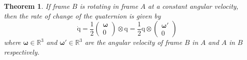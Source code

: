 \documentclass{amsart}
\newtheorem{theorem}{Theorem}[section]
\theoremstyle{definition}
\theoremstyle{remark}
\numberwithin{equation}{section}
\begin{document}
\begin{theorem}
  If frame $B$ is rotating in frame $A$ at a constant angular velocity, then the rate of change of the quaternion is given by
  \begin{equation}
    \mathrm{\dot{q}} = \frac{1}{2}
    \begin{pmatrix}
      \boldsymbol\omega\\
      0
    \end{pmatrix}
    \otimes \mathrm{q}
    = \frac{1}{2} \mathrm{q} \otimes
    \begin{pmatrix}
      \boldsymbol\omega'\\
      0
    \end{pmatrix}
  \end{equation}
  where $\boldsymbol\omega\in\mathbb{R}^3$ and $\boldsymbol\omega'\in\mathbb{R}^3$ are the angular velocity of frame $B$ in $A$ and $A$ in $B$ respectively.
\end{theorem}
\end{document}
